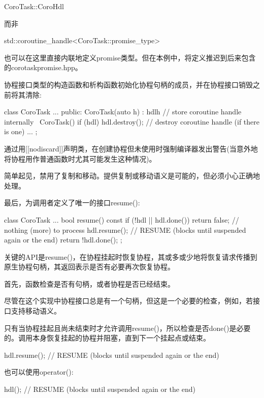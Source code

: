 \begin{cpp}
CoroTask::CoroHdl
\end{cpp}

而非

\begin{cpp}
std::coroutine_handle<CoroTask::promise_type>
\end{cpp}

也可以在这里直接内联地定义promise类型。但在本例中，将定义推迟到后来包含的corotaskpromise.hpp。

协程接口类型的构造函数和析构函数初始化协程句柄的成员，并在协程接口销毁之前将其清除:

\begin{cpp}
class CoroTask {
	...
	public:
	CoroTask(auto h)
	: hdl{h} { // store coroutine handle internally
	}
	~CoroTask() {
		if (hdl) {
			hdl.destroy(); // destroy coroutine handle (if there is one)
		}
	}
	...
};
\end{cpp}

通过用[[nodiscard]]声明类，在创建协程但未使用时强制编译器发出警告(当意外地将协程用作普通函数时尤其可能发生这种情况)。

简单起见，禁用了复制和移动。提供复制或移动语义是可能的，但必须小心正确地处理。

最后，为调用者定义了唯一的接口resume():

\begin{cpp}
class CoroTask {
	...
	bool resume() const {
		if (!hdl || hdl.done()) {
			return false; // nothing (more) to process
		}
		hdl.resume(); // RESUME (blocks until suspended again or the end)
		return !hdl.done();
	}
};
\end{cpp}

关键的API是resume()，在协程挂起时恢复协程，其或多或少地将恢复请求传播到原生协程句柄，其返回表示是否有必要再次恢复协程。

首先，函数检查是否有句柄，或者协程是否已经结束。

尽管在这个实现中协程接口总是有一个句柄，但这是一个必要的检查，例如，若接口支持移动语义。

只有当协程挂起且尚未结束时才允许调用resume()，所以检查是否done()是必要的。调用本身恢复挂起的协程并阻塞，直到下一个挂起点或结束。

\begin{cpp}
hdl.resume(); // RESUME (blocks until suspended again or the end)
\end{cpp}

也可以使用operator():

\begin{cpp}
hdl(); // RESUME (blocks until suspended again or the end)
\end{cpp}

